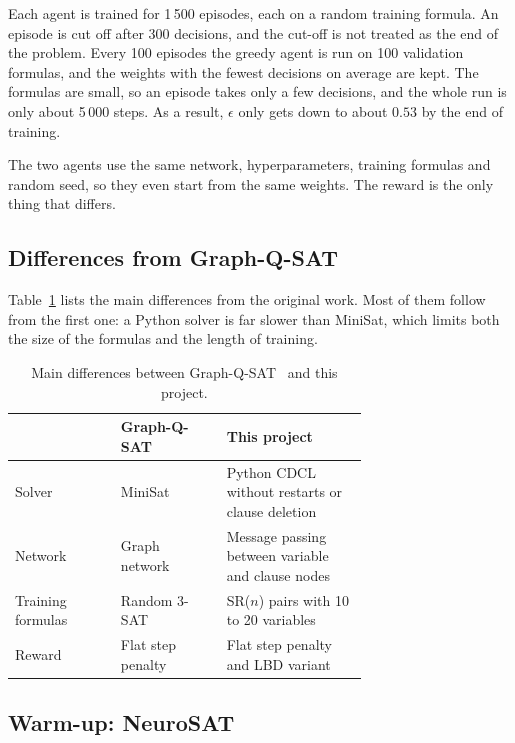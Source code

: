 \documentclass[11pt,a4paper]{article}
\begin{document}
Each agent is trained for 1\,500 episodes, each on a random training formula. An episode is cut off after 300 decisions, and the cut-off is not treated as the end of the problem. Every 100 episodes the greedy agent is run on 100 validation formulas, and the weights with the fewest decisions on average are kept. The formulas are small, so an episode takes only a few decisions, and the whole run is only about 5\,000 steps. As a result, $\epsilon$ only gets down to about $0.53$ by the end of training.

The two agents use the same network, hyperparameters, training formulas and random seed, so they even start from the same weights. The reward is the only thing that differs.

\subsection{Differences from Graph-Q-SAT}

Table~\ref{tab:differences} lists the main differences from the original work. Most of them follow from the first one: a Python solver is far slower than MiniSat, which limits both the size of the formulas and the length of training.

\begin{table}[H]
    \centering
    \caption{Main differences between Graph-Q-SAT~\cite{kurin2020gqsat} and this project.}
    \label{tab:differences}
    \begin{tabular}{lp{0.3\linewidth}p{0.4\linewidth}}
        \toprule
        & Graph-Q-SAT & This project \\
        \midrule
        Solver & MiniSat & Python CDCL without restarts or clause deletion \\
        Network & Graph network~\cite{battaglia2018relational} & Message passing between variable and clause nodes \\
        Training formulas & Random 3-SAT & SR($n$) pairs with 10 to 20 variables \\
        Reward & Flat step penalty & Flat step penalty and LBD variant \\
        \bottomrule
    \end{tabular}
\end{table}

\subsection{Warm-up: NeuroSAT}
\end{document}
